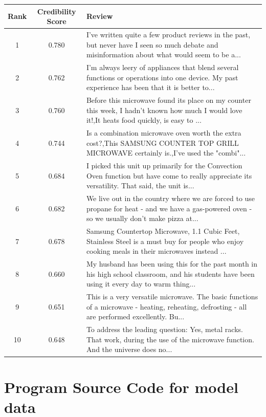 \documentclass{mcmthesis}
\begin{document}
\begin{appendices}
\begin{center}
\begin{tabularx}{0.95\textwidth}{|c|c|X|}
\hline
\multicolumn{1}{|l|}{Rank} &
  \textbf{Credibility Score} &
  \textbf{Review} \\ \hline
1 &
  0.780 &
  I've written quite a few product reviews in the past, but never have I seen so much debate and misinformation about what would seem to be a... \\ \hline
2 &
  0.762 &
  I’m always leery of appliances that blend several functions or operations into one device. My past experience has been that it is better to... \\ \hline
3 &
  0.760 &
  Before this microwave found its place on my counter this week, I hadn't known how much I would love it!,It heats food quickly, is easy to ... \\ \hline
4 &
  0.744 &
  Is a combination microwave oven worth the extra cost?,This SAMSUNG COUNTER TOP GRILL MICROWAVE certainly is.,I've used the "combi"... \\ \hline
5 &
  0.684 &
  I picked this unit up primarily for the Convection Oven function but have come to really appreciate its versatility. That said, the unit is... \\ \hline
6 &
  0.682 &
  We live out in the country where we are forced to use propane for heat - and we have a gas-powered oven - so we usually don't make pizza at... \\ \hline
7 &
  0.678 &
  Samsung Countertop Microwave, 1.1 Cubic Feet, Stainless Steel is a must buy for people who enjoy cooking meals in their microwaves instead ... \\ \hline
8 &
  0.660 &
  My husband has been using this for the past month in his high school classroom, and his students have been using it every day to warm thing... \\ \hline
9 &
  0.651 &
  This is a very versatile microwave. The basic functions of a microwave - heating, reheating, defrosting - all are performed excellently. Bu... \\ \hline
10 &
  0.648 &
  To address the leading question: Yes, metal racks. That work, during the use of the microwave function. And the universe does no... \\ \hline
\end{tabularx}
\end{center}

\newpage
 \section{Program Source Code for model data}

\end{appendices}
\end{document}
